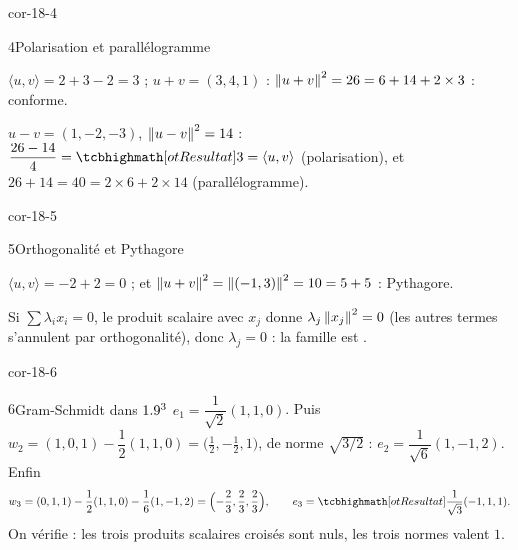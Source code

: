 \begin{blocLivre}{cor-18-4}
\begin{corrige}{4}{Polarisation et parallélogramme}
\begin{questions}
  \item $\langle u,v\rangle=2+3-2=3$ ; $u+v=(3,4,1)$ :
    $\left\lVert u+v\right\rVert^{2}=26=6+14+2\times3$ : conforme.
  \item $u-v=(1,-2,-3)$, $\left\lVert u-v\right\rVert^{2}=14$ :
    $\dfrac{26-14}{4}=\res{3}=\langle u,v\rangle$ (polarisation), et
    $26+14=40=2\times6+2\times14$ (parallélogramme).
\end{questions}
\end{corrige}
\end{blocLivre}

\begin{blocLivre}{cor-18-5}
\begin{corrige}{5}{Orthogonalité et Pythagore}
\begin{questions}
  \item $\langle u,v\rangle=-2+2=0$ ; et
    $\left\lVert u+v\right\rVert^{2}=\left\lVert(-1,3)\right\rVert^{2}=10=5+5$ : Pythagore.
  \item Si $\sum\lambda_ix_i=0$, le produit scalaire avec $x_j$ donne
    $\lambda_j\left\lVert x_j\right\rVert^{2}=0$ (les autres termes s'annulent par
    orthogonalité), donc $\lambda_j=0$ : la famille est
    .
\end{questions}
\end{corrige}
\end{blocLivre}

\begin{blocLivre}{cor-18-6}
\begin{corrige}{6}{Gram-Schmidt dans $1.9^{3}$}
$e_1=\dfrac{1}{\sqrt2}(1,1,0)$. Puis
$w_2=(1,0,1)-\dfrac12(1,1,0)=\bigl(\tfrac12,-\tfrac12,1\bigr)$, de norme
$\sqrt{3/2}$ : $e_2=\dfrac{1}{\sqrt6}(1,-1,2)$. Enfin
\[
w_3=(0,1,1)-\frac12(1,1,0)-\frac16(1,-1,2)
=\Bigl(-\frac23,\frac23,\frac23\Bigr),
\qquad
e_3=\res{\frac{1}{\sqrt3}(-1,1,1)} .
\]
On vérifie : les trois produits scalaires croisés sont nuls, les trois
normes valent $1$.
\end{corrige}
\end{blocLivre}

